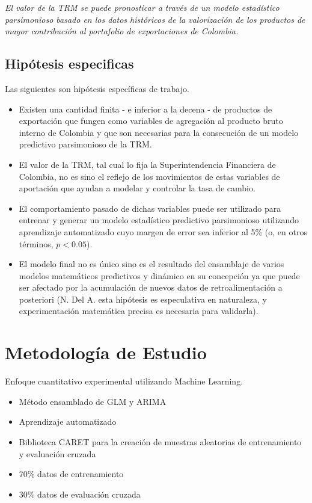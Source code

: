 \emph{El valor de la TRM se puede pronosticar a través de un modelo estadístico parsimonioso basado en los datos históricos de la valorización de los productos de mayor contribución al portafolio de exportaciones de Colombia.}

\subsection{Hipótesis especificas}
Las siguientes son hipótesis específicas de trabajo.

\begin{itemize}
	\item Existen una cantidad finita - e inferior a la decena - de productos de exportación que fungen como variables de agregación al producto bruto interno de Colombia y que son necesarias para la consecución de un modelo predictivo parsimonioso de la TRM.
	\item El valor de la TRM, tal cual lo fija la Superintendencia Financiera de Colombia, no es sino el reflejo de los movimientos de estas variables de aportación que ayudan a modelar y controlar la tasa de cambio.
	\item El comportamiento pasado de dichas variables puede ser utilizado para entrenar y generar un modelo estadístico predictivo parsimonioso utilizando aprendizaje automatizado cuyo margen de error sea inferior al 5\% (o, en otros términos, \(p < 0.05\)).
	\item El modelo final no es único sino es el resultado del ensamblaje de varios modelos matemáticos predictivos y dinámico en su concepción ya que puede ser afectado por la acumulación de nuevos datos de retroalimentación a posteriori (N. Del A. esta hipótesis es especulativa en naturaleza, y experimentación matemática precisa es necesaria para validarla).
\end{itemize}

\section{Metodología de Estudio}
Enfoque cuantitativo experimental utilizando Machine Learning.

\begin{itemize}
	\item Método ensamblado de GLM y ARIMA
	\item Aprendizaje automatizado
	\item Biblioteca CARET para la creación de muestras aleatorias de entrenamiento y evaluación cruzada
	\item 70\% datos de entrenamiento
	\item 30\% datos de evaluación cruzada
\end{itemize}
    
